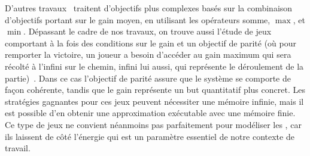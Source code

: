 D'autres travaux~\cite{velner12b} traitent d'objectifs plus complexes basés sur la combinaison d'objectifs portant sur le gain moyen, en utilisant les opérateurs somme, $\max$, et $\min$.
Dépassant le cadre de nos travaux, on trouve aussi l'étude de jeux comportant à la fois des conditions sur le gain et un objectif de parité (où pour remporter la victoire, un joueur a besoin d'accéder au gain maximum qui sera récolté à l'infini sur le chemin, infini lui aussi, qui représente le déroulement de la partie)~\cite{chatterjee05}.
Dans ce cas l'objectif de parité assure que le système se comporte de façon cohérente, tandis que le gain représente un but quantitatif plus concret.
Les stratégies gagnantes pour ces jeux peuvent nécessiter une mémoire infinie, mais il est possible d'en obtenir une approximation exécutable avec une mémoire finie.
Ce type de jeux ne convient néanmoins pas parfaitement pour modéliser les \rcs, car ils laissent de côté l'énergie qui est un paramètre essentiel de notre contexte de travail.
